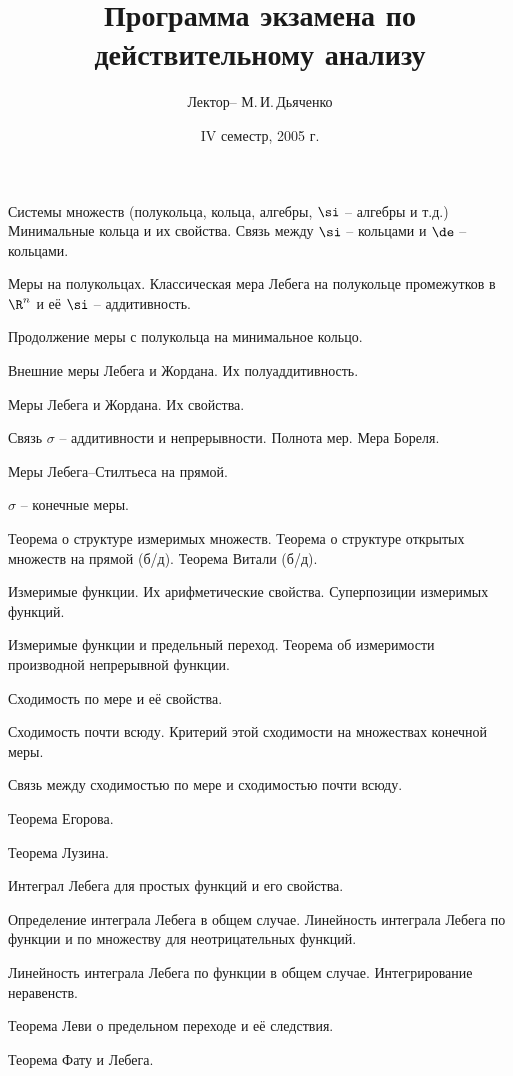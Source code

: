 \documentclass[a4paper]{article}
\title{Программа экзамена по действительному анализу}
\author{Лектор-- М.\,И.\,Дьяченко}
\date{IV семестр, 2005 г.}
\begin{document}
\maketitle


\begin{nums}{-1}
\item Системы множеств (полукольца, кольца, алгебры, $\si$ -- алгебры и т.д.)
Минимальные кольца и их свойства. Связь между $\si$ -- кольцами и $\de$ -- кольцами.
\item Меры на полукольцах. Классическая мера Лебега на полукольце промежутков в
$\R^n$ и её $\si$ -- аддитивность.
\item Продолжение меры с полукольца на минимальное кольцо.
\item Внешние меры Лебега и Жордана. Их полуаддитивность.
\item Меры Лебега и Жордана. Их свойства.
\item Связь $\sigma $ -- аддитивности и непрерывности. Полнота мер. Мера Бореля.
\item Меры Лебега--Стилтьеса на прямой.
\item $\sigma $ -- конечные меры.
\item Теорема о структуре измеримых множеств. Теорема о структуре открытых множеств на прямой (б/д). Теорема Витали (б/д).
\item Измеримые функции. Их арифметические свойства. Суперпозиции измеримых функций.
\item Измеримые функции и предельный переход. Теорема об измеримости производной непрерывной функции.
\item Сходимость по мере и её свойства.
\item Сходимость почти всюду. Критерий этой сходимости на множествах конечной меры.
\item Связь между сходимостью по мере и сходимостью почти всюду.
\item Теорема Егорова.
\item Теорема Лузина.
\item Интеграл Лебега для простых функций и его свойства.
\item Определение интеграла Лебега в общем случае. Линейность интеграла Лебега
по функции и по множеству для неотрицательных функций.
\item Линейность интеграла Лебега по функции в общем случае. Интегрирование неравенств.
\item Теорема Леви о предельном переходе и её следствия.
\item Теорема Фату и Лебега.

\end{nums}
\end{document}
